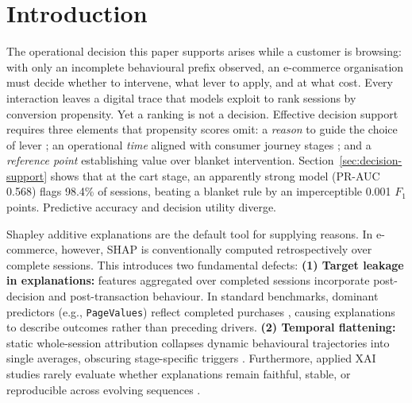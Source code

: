 \documentclass[a4paper]{article}
\begin{document}
\vspace{1em}

\section{Introduction}
\label{sec:intro}

The operational decision this paper supports arises while a customer is browsing:
with only an incomplete behavioural prefix observed, an e-commerce organisation
must decide whether to intervene, what lever to apply, and at what cost. Every
interaction leaves a digital trace that models exploit to rank sessions by
conversion propensity. Yet a ranking is not a decision. Effective decision
support requires three elements that propensity scores omit: a \emph{reason} to
guide the choice of lever \citep{rudin2019stop}; an operational \emph{time}
aligned with consumer journey stages \citep{bucklin2003model, moe2003buying,
lemon2016understanding}; and a \emph{reference point} establishing value over
blanket intervention. Section~\ref{sec:decision-support} shows that at the cart
stage, an apparently strong model (PR-AUC 0.568) flags 98.4\% of sessions, beating
a blanket rule by an imperceptible 0.001 $F_1$ points. Predictive accuracy and
decision utility diverge.

Shapley additive explanations \citep[SHAP;][]{lundberg2017unified,
lundberg2020local} are the default tool for supplying reasons. In e-commerce,
however, SHAP is conventionally computed retrospectively over complete sessions.
This introduces two fundamental defects:
\textbf{(1) Target leakage in explanations:} features aggregated over completed
sessions incorporate post-decision and post-transaction behaviour. In standard
benchmarks, dominant predictors (e.g., \texttt{PageValues}) reflect completed
purchases \citep{sakar2019real}, causing explanations to describe outcomes
rather than preceding drivers.
\textbf{(2) Temporal flattening:} static whole-session attribution collapses
dynamic behavioural trajectories into single averages, obscuring stage-specific
triggers \citep{verenich2019survey, wu2021early}. Furthermore, applied XAI
studies rarely evaluate whether explanations remain faithful, stable, or
reproducible across evolving sequences \citep{saarela2024recent, mainali2023meant,
nauta2023anecdotal, adadi2018peeking, wickramanayake2023generating, mehdiyev2024quantifying}.
\end{document}
